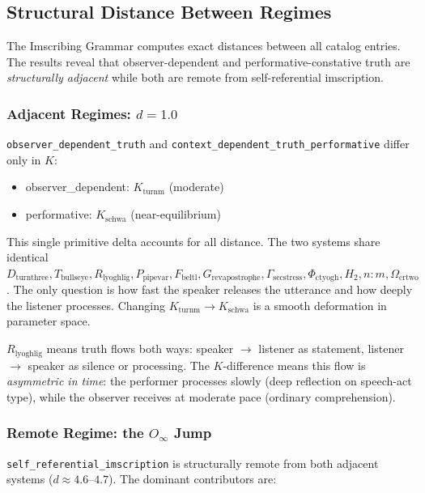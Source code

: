 \documentclass[12pt,a4paper]{article}
\begin{document}
\subsection{Structural Distance Between Regimes}

The Imscribing Grammar computes exact distances between all catalog entries. The results reveal that observer-dependent and performative-constative truth are \emph{structurally adjacent} while both are remote from self-referential imscription.

\subsubsection{Adjacent Regimes: $d=1.0$}

\texttt{observer\_dependent\_truth} and \texttt{context\_dependent\_truth\_performative} differ only in $K$:

\begin{itemize}
    \item observer\_dependent: $K_{\text{turnm}}$ (moderate)
    \item performative:    $K_{\text{schwa}}$ (near-equilibrium)
\end{itemize}

This single primitive delta accounts for all distance. The two systems share identical $D_{\text{turnthree}}, T_{\text{bullseye}}, R_{\text{lyoghlig}}, P_{\text{pipevar}}, F_{\text{beltl}}, G_{\text{revapostrophe}}, \Gamma_{\text{secstress}}, \Phi_{\text{ctyogh}}, H_2, n{:}m, \Omega_{\text{crtwo}}$. The only question is how fast the speaker releases the utterance and how deeply the listener processes. Changing $K_{\text{turnm}} \to K_{\text{schwa}}$ is a smooth deformation in parameter space.

$R_{\text{lyoghlig}}$ means truth flows both ways: speaker $\to$ listener as statement, listener $\to$ speaker as silence or processing. The $K$-difference means this flow is \emph{asymmetric in time}: the performer processes slowly (deep reflection on speech-act type), while the observer receives at moderate pace (ordinary comprehension).

\subsubsection{Remote Regime: the $O_{\infty}$ Jump}

\texttt{self\_referential\_imscription} is structurally remote from both adjacent systems ($d \approx 4.6\text{--}4.7$). The dominant contributors are:
\end{document}
